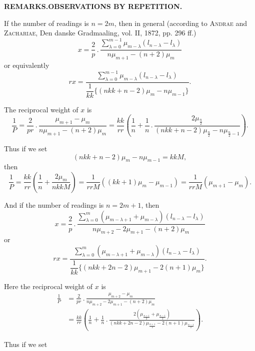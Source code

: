 \par\clearpage
\noindent\null\hfill{\small\textbf{REMARKS.\quad OBSERVATIONS BY REPETITION.}}\hfill{}\par\medskip
\begingroup\small
\par\noindent\hspace*{\parindent}If the number of readings is $n=2m$, then in general (according to \textsc{Andrae} and \textsc{Zachariae}, Den danske Gradmaaling, vol. II, 1872, pp. 296 ff.)
\[
x=\frac2p\,.\,\frac{\displaystyle\sum_{\lambda=0}^{m-1}\mu_{m-\lambda}(l_{n-\lambda}-l_\lambda)}{n\mu_{m+1}-(n+2)\mu_m}
\]
\noindent or equivalently
\[
rx=\frac{\displaystyle\sum_{\lambda=0}^{m-1}\mu_{m-\lambda}(l_{n-\lambda}-l_\lambda)}{\dfrac1{kk}\{(nkk+n-2)\mu_m-n\mu_{m-1}\}}.
\]
\par\noindent\hspace*{\parindent}The reciprocal weight of $x$ is
\[
\frac1P=\frac2{pr}\,.\,\frac{\mu_{m+1}-\mu_m}{n\mu_{m+1}-(n+2)\mu_m}
=\frac{kk}{rr}\left(\frac1n+\frac1n\,.\,\frac{2\mu_{\frac n2}}{(nkk+n-2)\mu_{\frac n2}-n\mu_{\frac n2-1}}\right).
\]
\par\noindent\hspace*{\parindent}Thus if we set
\[
(nkk+n-2)\mu_m-n\mu_{m-1}=kkM,
\]
\noindent then
\[
\frac1P=\frac{kk}{rr}\left(\frac1n+\frac{2\mu_m}{nkkM}\right)
=\frac1{rrM}((kk+1)\mu_m-\mu_{m-1})=\frac1{rrM}(\mu_{m+1}-\mu_m).
\]
\par\noindent\hspace*{\parindent}And if the number of readings is $n=2m+1$, then
\[
x=\frac2p\,.\,\frac{\displaystyle\sum_{\lambda=0}^{m}(\mu_{m-\lambda+1}+\mu_{m-\lambda})(l_{n-\lambda}-l_\lambda)}{n\mu_{m+2}-2\mu_{m+1}-(n+2)\mu_m}
\]
\noindent or
\[
rx=\frac{\displaystyle\sum_{\lambda=0}^{m}(\mu_{m-\lambda+1}+\mu_{m-\lambda})(l_{n-\lambda}-l_\lambda)}{\dfrac1{kk}\{(nkk+2n-2)\mu_{m+1}-2(n+1)\mu_m\}}.
\]
\par\noindent\hspace*{\parindent}Here the reciprocal weight of $x$ is
\[
\begin{aligned}
\frac1P&=\frac2{pr}\,.\,\frac{\mu_{m+2}-\mu_m}{n\mu_{m+2}-2\mu_{m+1}-(n+2)\mu_m}\\
&=\frac{kk}{rr}\left(\frac1n+\frac1n\,.\,\frac{2(\mu_{\frac{n+1}2}+\mu_{\frac{n-1}2})}{(nkk+2n-2)\mu_{\frac{n+1}2}-2(n+1)\mu_{\frac{n-1}2}}\right).
\end{aligned}
\]
\par\noindent\hspace*{\parindent}Thus if we set
